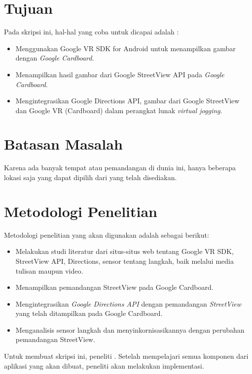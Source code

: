 
\section{Tujuan}
\label{sec:tujuan}
Pada skripsi ini, hal-hal yang coba untuk dicapai adalah :
\begin{itemize}
	\item Menggunakan Google VR SDK for Android untuk menampilkan gambar dengan {\it Google Cardboard}.
	\item Menampilkan hasil gambar dari Google StreetView API pada {\it Google Cardboard}.
	\item Mengintegrasikan Google Directions API, gambar dari Google StreetView dan Google VR (Cardboard) dalam perangkat lunak {\it virtual jogging}.
\end{itemize}


\section{Batasan Masalah}
\label{sec:batasan}
Karena ada banyak tempat atau pemandangan di dunia ini, hanya beberapa lokasi saja yang dapat dipilih dari yang telah disediakan.


\section{Metodologi Penelitian}
\label{sec:metlit}
Metodologi penelitian yang akan digunakan adalah sebagai berikut:
\begin{itemize}
	\item Melakukan studi literatur dari situs-situs web tentang Google VR SDK, StreetView API, Directions, sensor tentang langkah, baik melalui media tulisan maupun video.
	\item Menampilkan pemandangan StreetView pada Google Cardboard.
	\item Mengintegrasikan {\it Google Directions API} dengan pemandangan {\it StreetView} yang telah ditampilkan pada Google Cardboard.
	\item Menganalisis sensor langkah dan menyinkornisasikannya dengan perubahan pemandangan StreetView.
\end{itemize}
Untuk membuat skripsi ini, peneliti . Setelah mempelajari semua komponen dari aplikasi yang akan dibuat, peneliti akan melakukan implementasi. 

